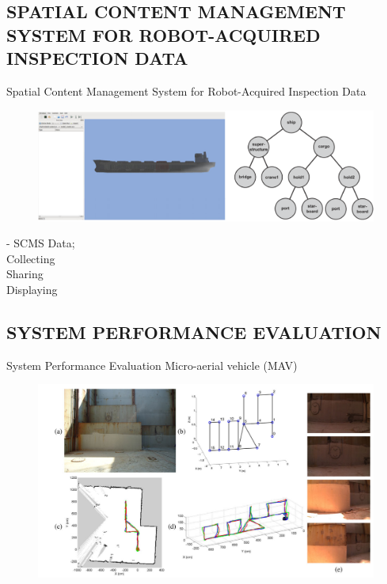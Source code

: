 \documentclass{beamer}
\begin{document}
        \subsection{SPATIAL CONTENT MANAGEMENT SYSTEM FOR ROBOT-ACQUIRED INSPECTION DATA}

            \begin{frame}{Spatial Content Management System for Robot-Acquired Inspection Data}
                \begin{figure}[htb]
                    \hfill \includegraphics[scale=0.15]{figuras/the_spatial_content_management_system.png}                   
                    \label{}
                \end{figure}                 
                - SCMS Data; \\
                Collecting \\
                Sharing \\
                Displaying

            \end{frame}

        \subsection{SYSTEM PERFORMANCE EVALUATION}

            \begin{frame}{System Performance Evaluation}
                Micro-aerial vehicle (MAV) 
                \begin{figure}[htb]
                    \centering
                    \includegraphics[scale=0.2]{figuras/MAV_results_in_autonomous_moode_from_the_second_field_trial.png}                   
                    \label{}
                \end{figure} 
            \end{frame}
\end{document}
